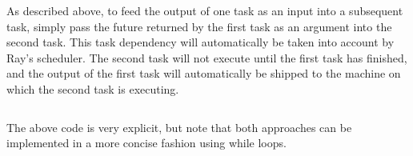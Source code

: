As described above, to feed the output of one task as an input into a subsequent task, simply pass the future returned by the first task as an argument into the second task. This task dependency will automatically be taken into account by Ray’s scheduler. The second task will not execute until the first task has finished, and the output of the first task will automatically be shipped to the machine on which the second task is executing.

\inputminted{python}{../src/03.ExplicitAggregation.py}

The above code is very explicit, but note that both approaches can be implemented in a more concise fashion using while loops.
